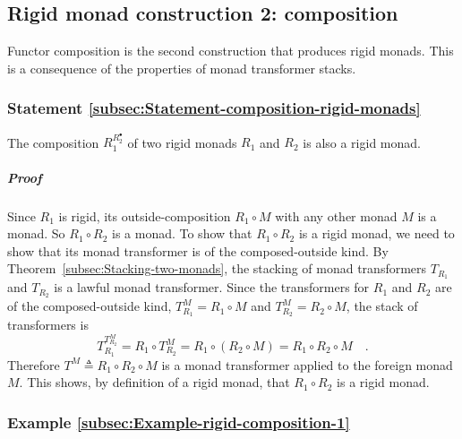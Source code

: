\begin{comment}
For the second and third laws, we need to use the composition laws
for $\phi$ and $\theta$, which can be written as
\begin{align*}
\left(f^{:A\Rightarrow M^{B}}\bef\phi\right)\diamond_{N}\left(g^{:B\Rightarrow M^{C}}\bef\phi\right) & =\left(f\diamond_{M}g\right)\bef\phi\quad,\\
\left(f^{:A\Rightarrow R^{B}}\bef\theta\right)\bef\left(g^{:B\Rightarrow M^{C}}\bef\theta\right) & =\left(f\diamond_{M}g\right)\bef\theta\quad.
\end{align*}
\end{comment}


\subsection{Rigid monad construction 2: composition}

Functor composition is the second construction that produces rigid
monads. This is a consequence of the properties of monad transformer
stacks.

\subsubsection{Statement \label{subsec:Statement-composition-rigid-monads}\ref{subsec:Statement-composition-rigid-monads}}

The composition $R_{1}^{R_{2}^{\bullet}}$ of two rigid monads $R_{1}$
and $R_{2}$ is also a rigid monad.

\subparagraph{Proof}

Since $R_{1}$ is rigid, its outside-composition $R_{1}\circ M$ with
any other monad $M$ is a monad. So $R_{1}\circ R_{2}$ is a monad.
To show that $R_{1}\circ R_{2}$ is a rigid monad, we need to show
that its monad transformer is of the composed-outside kind. By Theorem~\ref{subsec:Stacking-two-monads},
the stacking of monad transformers $T_{R_{1}}$and $T_{R_{2}}$ is
a lawful monad transformer. Since the transformers for $R_{1}$ and
$R_{2}$ are of the composed-outside kind, $T_{R_{1}}^{M}=R_{1}\circ M$
and $T_{R_{2}}^{M}=R_{2}\circ M$, the stack of transformers is 
\[
T_{R_{1}}^{T_{R_{2}}^{M}}=R_{1}\circ T_{R_{2}}^{M}=R_{1}\circ(R_{2}\circ M)=R_{1}\circ R_{2}\circ M\quad.
\]
Therefore $T^{M}\triangleq R_{1}\circ R_{2}\circ M$ is a monad transformer
applied to the foreign monad $M$. This shows, by definition of a
rigid monad, that $R_{1}\circ R_{2}$ is a rigid monad.

\subsubsection{Example \label{subsec:Example-rigid-composition-1}\ref{subsec:Example-rigid-composition-1}}

